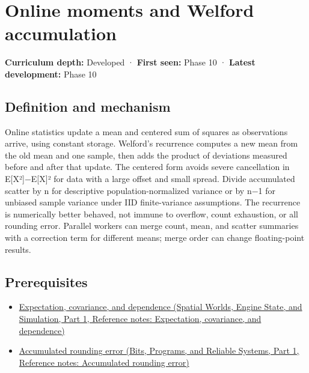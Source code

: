 \hypertarget{appendix-33237f0f618b}{}\label{referencestart:appendix-33237f0f618b}
\section{Online moments and Welford accumulation}\label{appendix-33237f0f618b-online-moments-and-welford-accumulation}

\hypertarget{appendix-33237f0f618b-online-moments-and-welford-accumulation}{}

\textbf{Curriculum depth:} Developed · \textbf{First seen:} Phase 10 · \textbf{Latest development:} Phase 10

\begin{allmightroledefinition}

\subsection{Definition and mechanism}\label{appendix-33237f0f618b-definition-and-mechanism}

\hypertarget{appendix-33237f0f618b-definition-and-mechanism}{}

Online statistics update a mean and centered sum of squares as observations arrive, using constant storage. Welford's recurrence computes a new mean from the old mean and one sample, then adds the product of deviations measured before and after that update. The centered form avoids severe cancellation in E{[}X²{]}−E{[}X{]}² for data with a large offset and small spread. Divide accumulated scatter by n for descriptive population-normalized variance or by n−1 for unbiased sample variance under IID finite-variance assumptions. The recurrence is numerically better behaved, not immune to overflow, count exhaustion, or all rounding error. Parallel workers can merge count, mean, and scatter summaries with a correction term for different means; merge order can change floating-point results.

\end{allmightroledefinition}

\subsection{Prerequisites}\label{appendix-33237f0f618b-prerequisites}

\hypertarget{appendix-33237f0f618b-prerequisites}{}

\begin{itemize}
\tightlist
\item
  \href{../05-Spatial-Worlds-Engine-State-and-Simulation-P01/main.pdf\#nameddest=appendix-54c383df9992}{Expectation, covariance, and dependence (Spatial Worlds, Engine State, and Simulation, Part 1, Reference notes: Expectation, covariance, and dependence)}
\item
  \href{../01-Bits-Programs-and-Reliable-Systems-P01/main.pdf\#nameddest=appendix-f82e270791c8}{Accumulated rounding error (Bits, Programs, and Reliable Systems, Part 1, Reference notes: Accumulated rounding error)}
\end{itemize}

